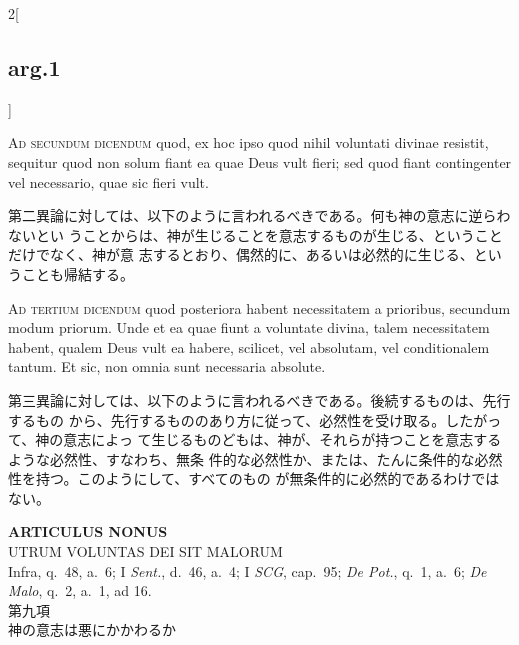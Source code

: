 \documentclass[paper=a4paper,fontsize=10pt,jafontsize=9pt,titlepage]{jlreq}
\begin{document}
\begin{paracol}{2}[\subsection{arg.1}]
\switchcolumn*[\subsection{ad.2}]


{\scshape Ad secundum dicendum} quod, ex hoc ipso quod nihil voluntati divinae
resistit, sequitur quod non solum fiant ea quae Deus vult fieri; sed quod fiant
contingenter vel necessario, quae sic fieri vult.

\switchcolumn

第二異論に対しては、以下のように言われるべきである。何も神の意志に逆らわないとい
うことからは、神が生じることを意志するものが生じる、ということだけでなく、神が意
志するとおり、偶然的に、あるいは必然的に生じる、ということも帰結する。

\switchcolumn*[\subsection{ad.3}]


{\scshape Ad tertium dicendum} quod posteriora habent necessitatem a prioribus,
secundum modum priorum. Unde et ea quae fiunt a voluntate divina, talem
necessitatem habent, qualem Deus vult ea habere, scilicet, vel absolutam, vel
conditionalem tantum. Et sic, non omnia sunt necessaria absolute.

\switchcolumn

第三異論に対しては、以下のように言われるべきである。後続するものは、先行するもの
から、先行するもののあり方に従って、必然性を受け取る。したがって、神の意志によっ
て生じるものどもは、神が、それらが持つことを意志するような必然性、すなわち、無条
件的な必然性か、または、たんに条件的な必然性を持つ。このようにして、すべてのもの
が無条件的に必然的であるわけではない。

\end{paracol}
\newpage


{}
\setcounter{section}{9}
\setcounter{subsection}{0}
\begin{center}
 {\Large {\bfseries ARTICULUS NONUS}}\\
 {\large UTRUM VOLUNTAS DEI SIT MALORUM}\\
 {\footnotesize Infra, q.~48, a.~6; I {\itshape Sent.}, d.~46, a.~4; I
 {\itshape SCG}, cap.~95; {\itshape De Pot.}, q.~1, a.~6; {\itshape De
 Malo}, q.~2, a.~1, ad 16.}\\
 {\Large 第九項\\神の意志は悪にかかわるか}
\end{center}
\end{document}
